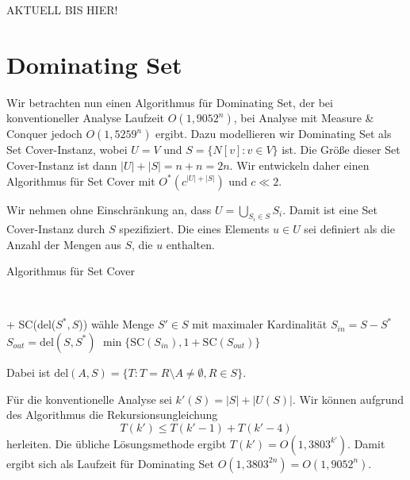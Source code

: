   AKTUELL BIS HIER!
  

\section{Dominating Set}
  Wir betrachten nun einen Algorithmus für Dominating Set, der bei konventioneller Analyse Laufzeit \(O(1{,}9052^n)\), bei Analyse mit Measure \& Conquer jedoch \(O(1{,}5259^n)\) ergibt. Dazu modellieren wir Dominating Set als Set Cover-Instanz, wobei \(U = V\) und \(S = \{ N[v] : v \in V \}\) ist. Die Größe dieser Set Cover-Instanz ist dann \(|U| + |S| = n + n = 2n\). Wir entwickeln daher einen Algorithmus für Set Cover mit \(O^*(c^{|U|+|S|})\) und \(c \ll 2\).

  Wir nehmen ohne Einschränkung an, dass \(U = \bigcup_{S_i \in S} S_i\). Damit ist eine Set Cover-Instanz durch \(S\) spezifiziert. Die  eines Elements \(u \in U\) sei definiert als die Anzahl der Mengen aus \(S\), die \(u\) enthalten.

  \begin{algorithm}[H]
    \caption{Algorithmus für Set Cover}

     \\
    \KwResult{}

     {
       + SC(del(\(S^*, S\)))
    }
    wähle Menge \(S' \in S\) mit maximaler Kardinalität \;
     {
      \(S_{in} = S - S^*\)\;
      \(S_{out} = \text{del}(S, S^*)\)\;
      \Return \(\min\{ \text{SC}(S_{in}), 1 + \text{SC}(S_{out}) \}\)
    }
  \end{algorithm}

  Dabei ist \(\text{del}(A,S) = \{ T : T = R \setminus A \neq \emptyset, R \in S \}\).

  Für die konventionelle Analyse sei \(k'(S) = |S| + |U(S)|\). Wir können aufgrund des Algorithmus die Rekursionsungleichung
  \[ T(k') \leq T(k' - 1) + T(k' - 4) \]
  herleiten. Die übliche Lösungsmethode ergibt \(T(k') = O(1{,}3803^{k'})\). Damit ergibt sich als Laufzeit für Dominating Set \(O(1{,}3803^{2n}) = O(1{,}9052^n)\).

